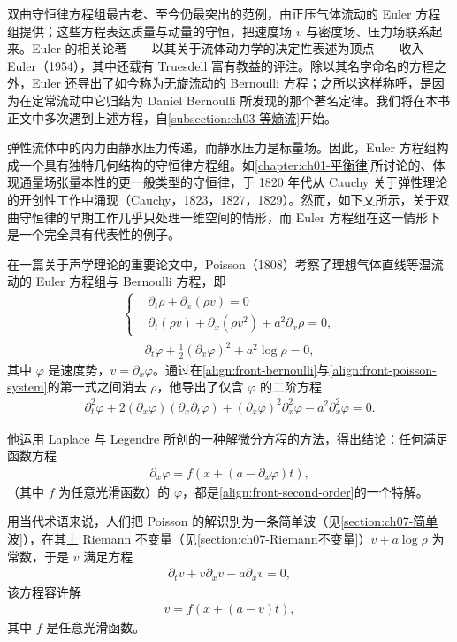 \documentclass[../../main.tex]{subfiles}
\begin{document}
双曲守恒律方程组最古老、至今仍最突出的范例，由正压气体流动的 Euler 方程组提供；这些方程表达质量与动量的守恒，把速度场 $v$ 与密度场、压力场联系起来。Euler 的相关论著——以其关于流体动力学的决定性表述为顶点——收入 Euler（1954），其中还载有 Truesdell 富有教益的评注。除以其名字命名的方程之外，Euler 还导出了如今称为无旋流动的 Bernoulli 方程；之所以这样称呼，是因为在定常流动中它归结为 Daniel Bernoulli 所发现的那个著名定律。我们将在本书正文中多次遇到上述方程，自\cref{subsection:ch03-等熵流}开始。

弹性流体中的内力由静水压力传递，而静水压力是标量场。因此，Euler 方程组构成一个具有独特几何结构的守恒律方程组。如\cref{chapter:ch01-平衡律}所讨论的、体现通量场张量本性的更一般类型的守恒律，于 1820 年代从 Cauchy 关于弹性理论的开创性工作中涌现（Cauchy，1823，1827，1829）。然而，如下文所示，关于双曲守恒律的早期工作几乎只处理一维空间的情形，而 Euler 方程组在这一情形下是一个完全具有代表性的例子。

在一篇关于声学理论的重要论文中，Poisson（1808）考察了理想气体直线等温流动的 Euler 方程组与 Bernoulli 方程，即
\begin{align}
\left\{\begin{aligned}
&\partial_t\rho+\partial_x(\rho v)=0\\
&\partial_t(\rho v)+\partial_x(\rho v^{2})+a^{2}\partial_x\rho=0,
\end{aligned}\right.\label{align:front-poisson-system}
\end{align}
\begin{align}
\partial_t\varphi+\frac{1}{2}(\partial_x\varphi)^{2}+a^{2}\log\rho=0,\label{align:front-bernoulli}
\end{align}
其中 $\varphi$ 是速度势，$v=\partial_x\varphi$。通过在\eqref{align:front-bernoulli}与\eqref{align:front-poisson-system}的第一式之间消去 $\rho$，他导出了仅含 $\varphi$ 的二阶方程
\begin{align}
\partial_t^{2}\varphi+2(\partial_x\varphi)(\partial_x\partial_t\varphi)+(\partial_x\varphi)^{2}\partial_x^{2}\varphi-a^{2}\partial_x^{2}\varphi=0.\label{align:front-second-order}
\end{align}

他运用 Laplace 与 Legendre 所创的一种解微分方程的方法，得出结论：任何满足函数方程
\begin{align}
\partial_x\varphi=f(x+(a-\partial_x\varphi)t),\label{align:front-functional}
\end{align}
（其中 $f$ 为任意光滑函数）的 $\varphi$，都是\eqref{align:front-second-order}的一个特解。

用当代术语来说，人们把 Poisson 的解识别为一条简单波（见\cref{section:ch07-简单波}），在其上 Riemann 不变量（见\cref{section:ch07-Riemann不变量}）$v+a\log\rho$ 为常数，于是 $v$ 满足方程
\begin{align}
\partial_t v+v\partial_x v-a\partial_x v=0,\label{align:front-simple-wave-eq}
\end{align}
该方程容许解
\begin{align}
v=f(x+(a-v)t),\label{align:front-simple-wave}
\end{align}
其中 $f$ 是任意光滑函数。
\end{document}
